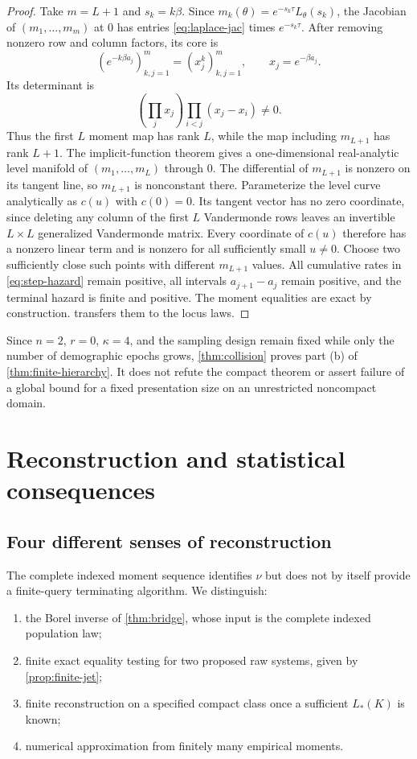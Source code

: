 \documentclass[11pt]{article}
\begin{document}
\begin{proof}
Take $m=L+1$ and $s_k=k\beta$.  Since $m_k(\theta)=e^{-s_k\tau}L_\theta(s_k)$, the Jacobian of $(m_1,\ldots,m_m)$ at $0$ has entries \eqref{eq:laplace-jac} times $e^{-s_k\tau}$.  After removing nonzero row and column factors, its core is
\[
(e^{-k\beta a_j})_{k,j=1}^m=(x_j^k)_{k,j=1}^m,
\qquad x_j=e^{-\beta a_j}.
\]
Its determinant is
\[
\left(\prod_jx_j\right)\prod_{i<j}(x_j-x_i)\ne0.
\]
Thus the first $L$ moment map has rank $L$, while the map including $m_{L+1}$ has rank $L+1$.  The implicit-function theorem gives a one-dimensional real-analytic level manifold of $(m_1,\ldots,m_L)$ through $0$.  The differential of $m_{L+1}$ is nonzero on its tangent line, so $m_{L+1}$ is nonconstant there.  Parameterize the level curve analytically as $c(u)$ with $c(0)=0$.  Its tangent vector has no zero coordinate, since deleting any column of the first $L$ Vandermonde rows leaves an invertible $L\times L$ generalized Vandermonde matrix.  Every coordinate of $c(u)$ therefore has a nonzero linear term and is nonzero for all sufficiently small $u\ne0$.  Choose two sufficiently close such points with different $m_{L+1}$ values.  All cumulative rates in \eqref{eq:step-hazard} remain positive, all intervals $a_{j+1}-a_j$ remain positive, and the terminal hazard is finite and positive.  The moment equalities are exact by construction.   transfers them to the locus laws.
\end{proof}

Since $n=2$, $r=0$, $\kappa=4$, and the sampling design remain fixed while only the number of demographic epochs grows, \cref{thm:collision} proves part (b) of \cref{thm:finite-hierarchy}.  It does not refute the compact theorem or assert failure of a global bound for a fixed presentation size on an unrestricted noncompact domain.

\section{Reconstruction and statistical consequences}
\label{sec:statistics}

\subsection{Four different senses of reconstruction}

The complete indexed moment sequence identifies $\nu$ but does not by itself provide a finite-query terminating algorithm.  We distinguish:
\begin{enumerate}
\item the Borel inverse of \cref{thm:bridge}, whose input is the complete indexed population law;
\item finite exact equality testing for two proposed raw systems, given by \cref{prop:finite-jet};
\item finite reconstruction on a specified compact class once a sufficient $L_*(K)$ is known;
\item numerical approximation from finitely many empirical moments.
\end{enumerate}
\end{document}
